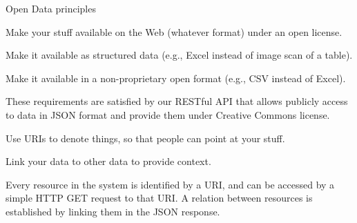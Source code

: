 \begin{frame}[allowframebreaks]{Open Data principles}
	\begin{block}{\faStar\faStarO\faStarO\faStarO\faStarO}
		Make your stuff available on the Web (whatever format) under an open
		license.
	\end{block}
	\begin{block}{\faStar\faStar\faStarO\faStarO\faStarO}
		Make it available as structured data (e.g., Excel instead of image scan
		of a table).
	\end{block}
	\begin{block}{\faStar\faStar\faStar\faStarO\faStarO}
		Make it available in a non-proprietary open format (e.g., CSV instead of
		Excel).
	\end{block}
	These requirements are satisfied by our RESTful API that allows
	publicly access to data in JSON format and provide them under Creative
	Commons license.

	\begin{block}{\faStar\faStar\faStar\faStar\faStarO}
		Use URIs to denote things, so that people can point at your stuff.
	\end{block}
	\begin{block}{\faStar\faStar\faStar\faStar\faStar}
		Link your data to other data to provide context.
	\end{block}
	Every resource in the system is identified by a URI, and can be accessed
	by a simple HTTP GET request to that URI. A relation between resources
	is established by linking them in the JSON response.

\end{frame}
